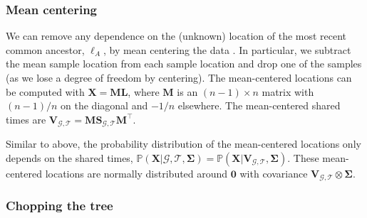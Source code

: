 \documentclass[12pt]{article}
\begin{document}
\subsubsection*{Mean centering}

We can remove any dependence on the (unknown) location of the most recent common ancestor, $\bm{\ell}_A$, by mean centering the data \citep[e.g.,][]{lee2017distinguishing}.
In particular, we subtract the mean sample location from each sample location and drop one of the samples (as we lose a degree of freedom by centering).
The mean-centered locations can be computed with $\mathbf{X}=\mathbf{M}\mathbf{L}$, where $\mathbf{M}$ is an $(n-1)\times n$ matrix with $(n-1)/n$ on the diagonal and $-1/n$ elsewhere.
The mean-centered shared times are $\mathbf{V}_{\mathcal{G},\mathcal{T}}=\mathbf{M}\mathbf{S}_{\mathcal{G},\mathcal{T}}\mathbf{M}^\intercal$. %

Similar to above, the probability distribution of the mean-centered locations only depends on the shared times, $\mathbb{P}(\mathbf{X} | \mathcal{G},\mathcal{T}, \mathbf{\Sigma}) = \mathbb{P}(\mathbf{X} | \mathbf{V}_{\mathcal{G},\mathcal{T}}, \mathbf{\Sigma})$.
These mean-centered locations are normally distributed around $\mathbf{0}$ with covariance $\mathbf{V}_{\mathcal{G},\mathcal{T}} \otimes \mathbf{\Sigma}$.
%

\subsubsection*{Chopping the tree}
\end{document}
